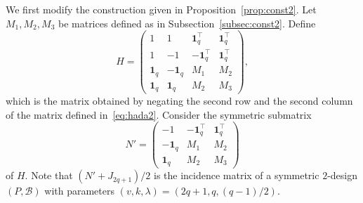 \documentclass[10pt]{amsart}
\theoremstyle{definition}
\newcommand*\tra{\top}
\newcommand*{\un}{\mathbf{1}}
\begin{document}
We first modify the construction given in Proposition~\ref{prop:const2}. Let $M_1,M_2,M_3$ be matrices defined as in Subsection~\ref{subsec:const2}. Define
\begin{equation}\label{eq:hada3}
H=
\begin{pmatrix}
1 &1 & \un_q^\tra& \un_q^\tra \\
1 & -1 & -\un_q^\tra&\un_q^\tra \\
\un_q & -\un_q &M_1 & M_2 \\
\un_q & \un_q&M_2 & M_3
\end{pmatrix},
\end{equation}
which is the matrix obtained by negating the second row and the second column of the matrix defined in~\eqref{eq:hada2}. Consider the symmetric submatrix
\begin{equation}\label{eq:hada4}
N'=
\begin{pmatrix}
-1 & -\un_q^\tra & \un_q^\tra \\
-\un_q & M_1& M_2 \\
\un_q& M_2 & M_3
\end{pmatrix}
\end{equation}
of $H$. Note that $(N'+J_{2q+1})/2$ is the incidence matrix of a symmetric $2$-design $(P,{\mathcal B})$ with parameters $(v,k,\lambda)=(2q+1,q,(q-1)/2)$.
\end{document}
